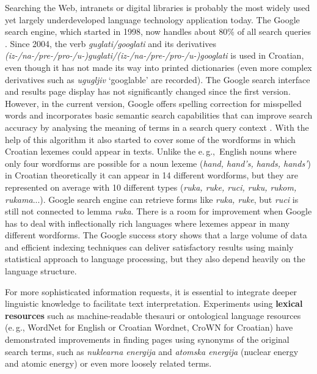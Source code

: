 \begin{multicols}{2}
Searching the Web, intranets or digital libraries is probably the most widely used yet largely underdeveloped language technology application today. The Google search engine, which started in 1998, now handles about 80\% of all search queries \cite{str14}. Since 2004, the verb \emph{guglati/googlati} and its derivatives \emph{(iz-/na-/pre-/pro-/u-)guglati/(iz-/na-/pre-/pro-/u-)googlati} is used in Croatian, even though it has not made its way into printed dictionaries (even more complex derivatives such as \emph{ugugljiv} ‘googlable’ are recorded). The Google search interface and results page display has not significantly changed since the first version. However, in the current version, Google offers spelling correction for misspelled words and incorporates basic semantic search capabilities that can improve search accuracy by analysing the meaning of terms in a search query context \cite{str15}. With the help of this algorithm it also started to cover some of the wordforms in which Croatian lexemes could appear in texts. Unlike the e.\,g.,~English nouns where only four wordforms are possible for a noun lexeme (\emph{hand, hand’s, hands, hands’}) in Croatian theoretically it can appear in 14 different wordforms, but they are represented on average with 10 different types (\emph{ruka, ruke, ruci, ruku, rukom, rukama}...). Google search engine can retrieve forms like \emph{ruka, ruke}, but \emph{ruci} is still not connected to lemma \emph{ruka}. There is a room for improvement when Google has to deal with inflectionally rich languages where lexemes appear in many different wordforms. The Google success story shows that a large volume of data and efficient indexing techniques can deliver satisfactory results using mainly statistical approach to language processing, but they also depend heavily on the language structure.


For more sophisticated information requests, it is essential to integrate deeper linguistic knowledge to facilitate text interpretation. Experiments using \textbf{lexical resources} such as machine-readable thesauri or ontological language resources (e.\,g., WordNet for English or Croatian Wordnet, CroWN for Croatian) have demonstrated improvements in finding pages using synonyms of the original search terms, such as \emph{nuklearna energija} and \emph{atomska energija} (nuclear energy and atomic energy) or even more loosely related terms. 


\end{multicols}
